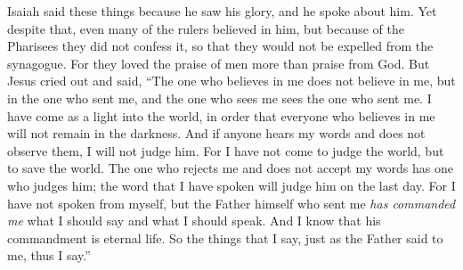 \begin{biblechapter}
\verse Isaiah said these things because he saw his glory, and he spoke about him.
\verse Yet despite that, even many of the rulers believed in him, but because of the Pharisees they did not confess it, so that they would not be expelled from the synagogue.
\verse For they loved the praise of men more than praise from God.
 But Jesus cried out and said, “The one who believes in me does not believe in me, but in the one who sent me,
\verse and the one who sees me sees the one who sent me.
\verse I have come as a light into the world, in order that everyone who believes in me will not remain in the darkness.
\verse And if anyone hears my words and does not observe them, I will not judge him. For I have not come to judge the world, but to save the world.
\verse The one who rejects me and does not accept my words has one who judges him; the word that I have spoken will judge him on the last day.
\verse For I have not spoken from myself, but the Father himself who sent me \textit{has commanded me} what I should say and what I should speak.
\verse And I know that his commandment is eternal life. So the things that I say, just as the Father said to me, thus I say.”
\end{biblechapter}

